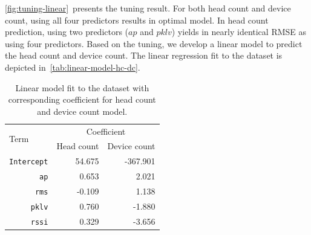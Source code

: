 	\autoref{fig:tuning-linear}~presents the tuning result. For both head count and device count, using all four predictors results in optimal model. In head count prediction, using two predictors ($ap$ and $pklv$) yields in nearly identical \ac{RMSE} as using four predictors. Based on the tuning, we develop a linear model to predict the head count and device count. The linear regression fit to the dataset is depicted in~\autoref{tab:linear-model-hc-dc}.

	
		\begin{table}[h]
		\centering
		\caption[Linear model fit to the dataset]
		{Linear model fit to the dataset with corresponding coefficient for head count and device count model.}
		\label{tab:linear-model-hc-dc}
		\begin{tabular}{rrr}
		\toprule
		\multicolumn{1}{l}{\multirow{2}{*}{Term}} & \multicolumn{2}{c}{Coefficient}                                   \\
		\multicolumn{1}{l}{}                      & \multicolumn{1}{c}{Head count} & \multicolumn{1}{c}{Device count} \\ \midrule
		\verb|Intercept|                          & 54.675 & -367.901 \\
		\verb|ap|                                 & 0.653  & 2.021 \\
		\verb|rms|                                & -0.109 & 1.138 \\
		\verb|pklv|                               & 0.760  & -1.880 \\
		\verb|rssi|                               & 0.329  & -3.656 \\ \bottomrule
		\end{tabular}
		\end{table}
	


	


